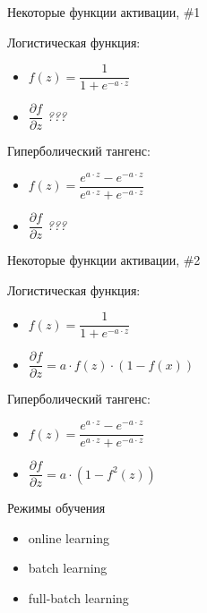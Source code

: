 \documentclass[10pt]{beamer}
\begin{document}
\begin{frame}{Некоторые функции активации, \#1}

Логистическая функция: 
\begin{itemize}
	\item $f(z) = \dfrac{1}{1 + e^{-a\cdot z}}$
	\item $\dfrac{\partial f}{\partial z}$ \textit{???}
\end{itemize}
Гиперболический тангенс: 
\begin{itemize}
	\item $f(z) = \dfrac{e^{a\cdot z} - e^{-a\cdot z}}{e^{a\cdot z} + e^{-a\cdot z}}$
	\item $\dfrac{\partial f}{\partial z}$ \textit{???}
\end{itemize}

\end{frame}

\begin{frame}{Некоторые функции активации, \#2}

Логистическая функция: 
\begin{itemize}
	\item $f(z) = \dfrac{1}{1 + e^{-a\cdot z}}$
	\item $\dfrac{\partial f}{\partial z} = a \cdot f(z) \cdot \left( 1 - f(x) \right)$
\end{itemize}
Гиперболический тангенс: 
\begin{itemize}
	\item $f(z) = \dfrac{e^{a\cdot z} - e^{-a\cdot z}}{e^{a\cdot z} + e^{-a\cdot z}}$
	\item $\dfrac{\partial f}{\partial z} = a \cdot \left( 1 - f^2(z) \right)$
\end{itemize}

\end{frame}


\begin{frame}{Режимы обучения}

\begin{itemize}
	\item online learning
	\item batch learning
	\item full-batch learning
\end{itemize}

\end{frame}
\end{document}
